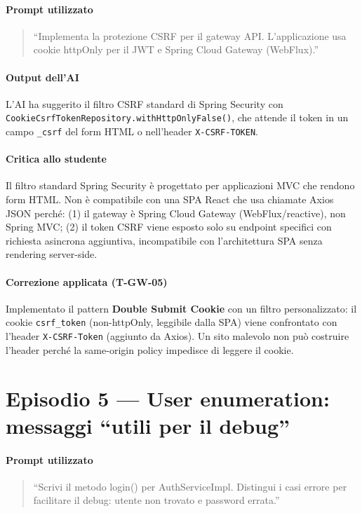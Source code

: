 ﻿\documentclass[a4paper,12pt]{report}
\begin{document}
\paragraph{Prompt utilizzato}
\begin{quote}
``Implementa la protezione CSRF per il gateway API. L'applicazione usa cookie
httpOnly per il JWT e Spring Cloud Gateway (WebFlux).''
\end{quote}

\paragraph{Output dell'AI}
L'AI ha suggerito il filtro CSRF standard di Spring Security con
\texttt{CookieCsrfTokenRepository.withHttpOnlyFalse()}, che attende il token
in un campo \texttt{\_csrf} del form HTML o nell'header \texttt{X-CSRF-TOKEN}.

\paragraph{Critica allo studente}
Il filtro standard Spring Security è progettato per applicazioni MVC che rendono
form HTML. Non è compatibile con una SPA React che usa chiamate Axios JSON perché:
(1) il gateway è Spring Cloud Gateway (WebFlux/reactive), non Spring MVC;
(2) il token CSRF viene esposto solo su endpoint specifici con richiesta asincrona
aggiuntiva, incompatibile con l'architettura SPA senza rendering server-side.

\paragraph{Correzione applicata (T-GW-05)}
Implementato il pattern \textbf{Double Submit Cookie} con un filtro personalizzato:
il cookie \texttt{csrf\_token} (non-httpOnly, leggibile dalla SPA) viene confrontato
con l'header \texttt{X-CSRF-Token} (aggiunto da Axios). Un sito malevolo non può
costruire l'header perché la same-origin policy impedisce di leggere il cookie.

\section{Episodio 5 --- User enumeration: messaggi ``utili per il debug''}

\paragraph{Prompt utilizzato}
\begin{quote}
``Scrivi il metodo login() per AuthServiceImpl. Distingui i casi
errore per facilitare il debug: utente non trovato e password errata.''
\end{quote}
\end{document}
